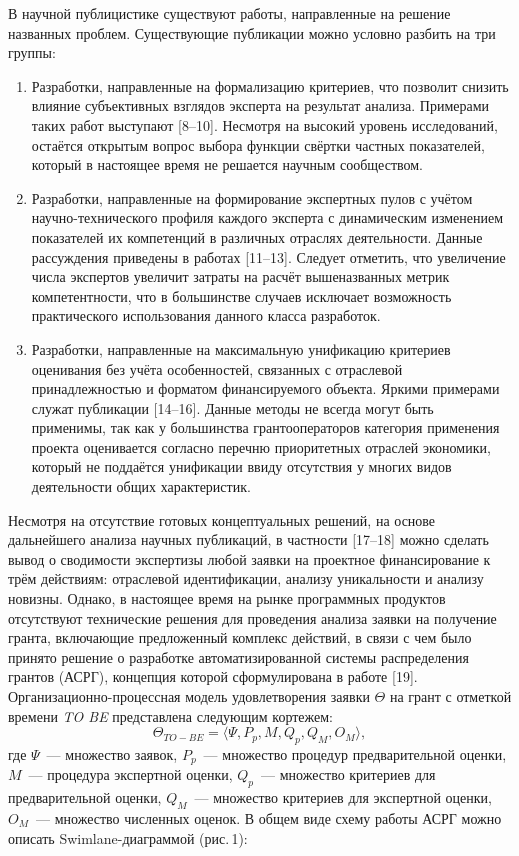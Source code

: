 В научной публицистике существуют работы, направленные на решение названных проблем. Существующие публикации можно условно разбить на три группы:
\begin{enumerate}[noitemsep]
  \item Разработки, направленные на формализацию критериев, что позволит снизить влияние субъективных взглядов эксперта на результат анализа. Примерами таких работ выступают [8--10]. Несмотря на высокий уровень исследований, остаётся открытым вопрос выбора функции свёртки частных показателей, который в настоящее время не решается научным сообществом.
  \item Разработки, направленные на формирование экспертных пулов с учётом научно-технического профиля каждого эксперта с динамическим изменением показателей их компетенций в различных отраслях деятельности. Данные рассуждения приведены в работах [11--13]. Следует отметить, что увеличение числа экспертов увеличит затраты на расчёт вышеназванных метрик компетентности, что в большинстве случаев исключает возможность практического использования данного класса разработок.
  \item Разработки, направленные на максимальную унификацию критериев оценивания без учёта особенностей, связанных с отраслевой принадлежностью и форматом финансируемого объекта. Яркими примерами служат публикации [14--16]. Данные методы не всегда могут быть применимы, так как у большинства грантооператоров категория применения проекта оценивается согласно перечню приоритетных отраслей экономики, который не поддаётся унификации ввиду отсутствия у многих видов деятельности общих характеристик.
\end{enumerate}

Несмотря на отсутствие готовых концептуальных решений, на основе дальнейшего анализа научных публикаций, в частности [17--18] можно сделать вывод о сводимости экспертизы любой заявки на проектное финансирование к трём действиям: отраслевой идентификации, анализу уникальности и анализу новизны. Однако, в настоящее время на рынке программных продуктов отсутствуют технические решения для проведения анализа заявки на получение гранта, включающие предложенный комплекс действий, в связи с чем было принято решение о разработке автоматизированной системы распределения грантов (АСРГ), концепция которой сформулирована в работе [19]. Организационно-процессная модель удовлетворения заявки $\Theta$ на грант с отметкой времени \textit{TO BE} представлена следующим кортежем:
\begin{equation}
  \Theta_{TO-BE} = \langle \Psi, P_p, M, Q_p, Q_M, O_M \rangle,
\end{equation}
где $\Psi$~--- множество заявок, $P_p$~--- множество процедур предварительной оценки, $M$~--- процедура экспертной оценки, $Q_p$~--- множество критериев для предварительной оценки, $Q_M$~--- множество критериев для экспертной оценки, $O_M$~--- множество численных оценок. В общем виде схему работы АСРГ можно описать Swimlane-диаграммой (рис.\,1):

